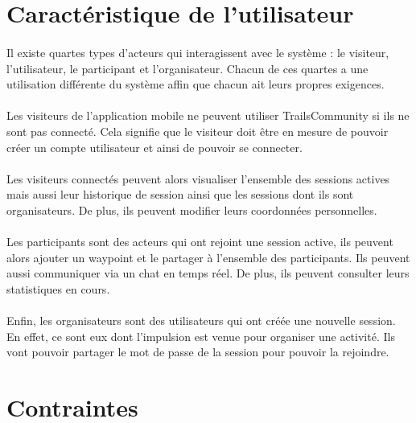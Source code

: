 \documentclass[titlepage, 12pt]{report}
\begin{document}
\section{Caractéristique de l'utilisateur}

\paragraph{}Il existe quartes types d'acteurs qui interagissent avec le système : le visiteur, l'utilisateur, le participant et l'organisateur. Chacun de ces quartes a une utilisation différente du système affin que chacun ait leurs propres exigences.

\paragraph{}Les visiteurs de l'application mobile ne peuvent utiliser TrailsCommunity si ils ne sont pas connecté. Cela signifie que le visiteur doit être en mesure de pouvoir créer un compte utilisateur et ainsi de pouvoir se connecter.

\paragraph{}Les visiteurs connectés peuvent alors visualiser l'ensemble des sessions actives mais aussi leur historique de session ainsi que les sessions dont ils sont organisateurs.
De plus, ils peuvent modifier leurs coordonnées personnelles.

\paragraph{}Les participants sont des acteurs qui ont rejoint une session active, ils peuvent alors ajouter un waypoint et le partager à l'ensemble des participants. Ils peuvent aussi communiquer via un chat en temps réel. De plus, ils peuvent consulter leurs statistiques en cours.

\paragraph{}Enfin, les organisateurs sont des utilisateurs qui ont créée une nouvelle session. En effet, ce sont eux dont l'impulsion est venue pour organiser une activité. Ils vont pouvoir partager le mot de passe de la session pour pouvoir la rejoindre.

\section{Contraintes}
\end{document}
